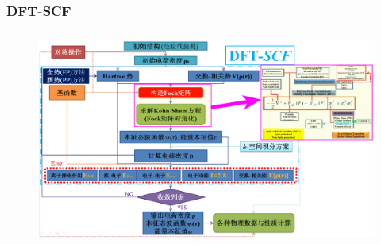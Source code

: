 \documentclass[cjk,slidestop,compress,mathserif,blue]{beamer}
\begin{document}
\frame
{
	\frametitle{\textrm{DFT-SCF}}
\begin{figure}[h!]
\centering
\vspace*{-0.25in}
\hspace*{-0.80in}
\includegraphics[height=2.80in,width=4.95in,viewport=5 3 1490 870,clip]{Figures/DFT-SCF_2.png}
\label{DFT-SCF-2}
\end{figure}
}
\end{document}
